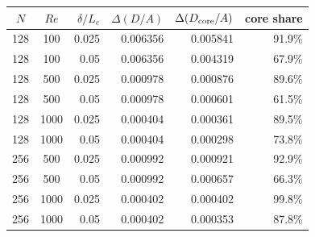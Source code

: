 \begin{tabular}{@{}ccrrrr@{}}
\toprule
$N$ & $Re$ & $\delta/L_c$ & $\Delta(D/A)$ & $\Delta(D_{\rm core}/A)$ & core share \\
\midrule
128 & 100 & 0.025 & 0.006356 & 0.005841 & 91.9\% \\
128 & 100 & 0.05 & 0.006356 & 0.004319 & 67.9\% \\
128 & 500 & 0.025 & 0.000978 & 0.000876 & 89.6\% \\
128 & 500 & 0.05 & 0.000978 & 0.000601 & 61.5\% \\
128 & 1000 & 0.025 & 0.000404 & 0.000361 & 89.5\% \\
128 & 1000 & 0.05 & 0.000404 & 0.000298 & 73.8\% \\
256 & 500 & 0.025 & 0.000992 & 0.000921 & 92.9\% \\
256 & 500 & 0.05 & 0.000992 & 0.000657 & 66.3\% \\
256 & 1000 & 0.025 & 0.000402 & 0.000402 & 99.8\% \\
256 & 1000 & 0.05 & 0.000402 & 0.000353 & 87.8\% \\
\bottomrule
\end{tabular}
